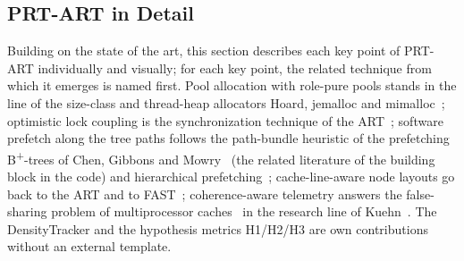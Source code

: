 \begin{nurlang}
\section{PRT-ART in Detail}\label{sec:prtart-impl}
Building on the state of the art, this section describes each key point of PRT-ART individually and
visually; for each key point, the related technique from which it emerges is named first. Pool
allocation with role-pure pools stands in the line of the size-class and thread-heap allocators Hoard,
jemalloc and mimalloc~\cite{berger2000hoard,evans2006jemalloc,leijen2019mimalloc}; optimistic lock
coupling is the synchronization technique of the ART~\cite{leis2016olc}; software prefetch along the
tree paths follows the path-bundle heuristic of the prefetching B\textsuperscript{+}-trees of Chen,
Gibbons and Mowry~\cite{chen2001prefetch} (the related literature of the building block in the code)
and hierarchical prefetching~\cite{zhang2025hierarchical}; cache-line-aware node layouts go back to the
ART and to FAST~\cite{leis2013art,kim2010fast}; coherence-aware telemetry answers the false-sharing
problem of multiprocessor caches~\cite{torrellas1994falsesharing} in the research line of
Kuehn~\cite{kuehn2023bplustree}. The DensityTracker and the hypothesis metrics H1/H2/H3 are own
contributions without an external template.


\end{nurlang}
